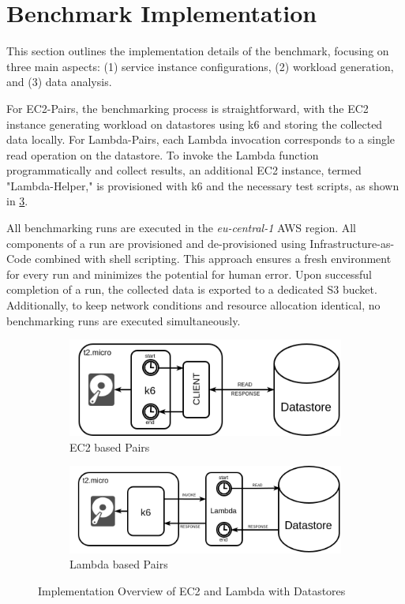\section{Benchmark Implementation}
\label{cha:implementation}

This section outlines the implementation details of the benchmark, focusing on three main aspects: (1) service instance configurations, (2) workload generation, and (3) data analysis.

For EC2-Pairs, the benchmarking process is straightforward, with the EC2 instance generating workload on datastores using k6 and storing the collected data locally. For Lambda-Pairs, each Lambda invocation corresponds to a single read operation on the datastore. To invoke the Lambda function programmatically and collect results, an additional EC2 instance, termed "Lambda-Helper," is provisioned with k6 and the necessary test scripts, as shown in \cref{fig:impl_overview}.

All benchmarking runs are executed in the \textit{eu-central-1} AWS region. All components of a run are provisioned and de-provisioned using Infrastructure-as-Code combined with shell scripting. This approach ensures a fresh environment for every run and minimizes the potential for human error. Upon successful completion of a run, the collected data is exported to a dedicated S3 bucket. Additionally, to keep network conditions and resource allocation identical, no benchmarking runs are executed simultaneously.

\begin{figure}[h]
	\begin{subfigure}{0.45\linewidth}
		\centering
		\includegraphics[width=\linewidth]{./fig/ec2-pairs.png}
		\caption{EC2 based Pairs}
		\label{fig:impl_ec2_pairs}
	\end{subfigure}
	\hfill
	\begin{subfigure}{0.45\linewidth}
		\centering
		\includegraphics[width=\linewidth]{./fig/lambda-pairs.png}
		\caption{Lambda based Pairs}
		\label{fig:impl_lambda_pairs}
	\end{subfigure}
	\caption{Implementation Overview of EC2 and Lambda with Datastores}
	\label{fig:impl_overview}
\end{figure}

